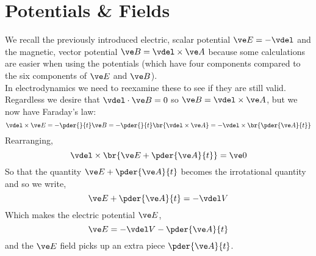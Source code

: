 \documentclass{article}
\begin{document}
\section{Potentials \& Fields}
We recall the previously introduced electric, scalar potential $\ve E = - \vdel$ and the magnetic, vector potential $\ve B =\vdel \times\ve A$ because some calculations are easier when using the potentials (which have four components compared to the six components of $\ve E$ and $\ve B$). \\

In electrodynamics we need to reexamine these to see if they are still valid. Regardless we desire that $\vdel \cdot \ve B = 0$ so $\ve B = \vdel \times \ve A$, but we now have Faraday's law:
\[ \vdel \times \ve E = - \pder{}{t} \ve B = -\pder{}{t} \br{\vdel \times \ve A} = - \vdel \times \br{\pder{\ve A}{t}}\]
Rearranging,
\[ \vdel \times \br{\ve E + \pder{\ve A}{t}} = \ve 0 \]
So that the quantity $\ve E + \pder{\ve A}{t}$ becomes the irrotational quantity and so we write,
\[ \ve E + \pder{\ve A}{t} = - \vdel V \]
Which makes the electric potential $\ve E$,
\[ \ve E = - \vdel V - \pder{\ve A}{t} \]
and the $\ve E$ field picks up an extra piece $\pder{\ve A}{t}$. \\
\end{document}
